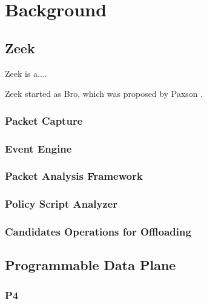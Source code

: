 \chapter{Background}
\label{cap:background}



\section{Zeek}
\label{sec:bg:zeek}

Zeek is a.... \cite{AboutZeek}

Zeek started as Bro, which was proposed by Paxson \cite{Paxson1999}.

\subsection{Packet Capture}

\subsection{Event Engine}
\label{sec:bg:zeek_ee}

\subsection{Packet Analysis Framework}
\label{sec:bg:zeek_packet_analysis}

\subsection{Policy Script Analyzer}
\label{sec:bg:zeek_psi}

\subsection{Candidates Operations for Offloading}
\label{sec:bg:zeek_candidate_operations}

\section{Programmable Data Plane}
\label{sec:bg:pdp}

\subsection{P4}
\label{sec:bg:p4}

